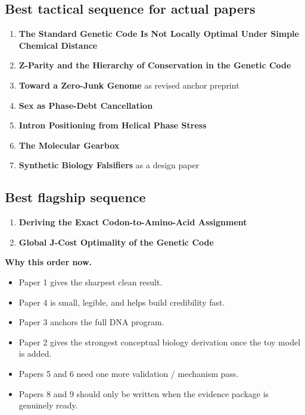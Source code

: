 \documentclass[11pt]{article}
\begin{document}
\subsection*{Best tactical sequence for actual papers}
\begin{enumerate}
\item \textbf{The Standard Genetic Code Is Not Locally Optimal Under Simple Chemical Distance}
\item \textbf{Z-Parity and the Hierarchy of Conservation in the Genetic Code}
\item \textbf{Toward a Zero-Junk Genome} as revised anchor preprint
\item \textbf{Sex as Phase-Debt Cancellation}
\item \textbf{Intron Positioning from Helical Phase Stress}
\item \textbf{The Molecular Gearbox}
\item \textbf{Synthetic Biology Falsifiers} as a design paper
\end{enumerate}

\subsection*{Best flagship sequence}
\begin{enumerate}
\item \textbf{Deriving the Exact Codon-to-Amino-Acid Assignment}
\item \textbf{Global J-Cost Optimality of the Genetic Code}
\end{enumerate}

\textbf{Why this order now.}
\begin{itemize}
\item Paper 1 gives the sharpest clean result.
\item Paper 4 is small, legible, and helps build credibility fast.
\item Paper 3 anchors the full DNA program.
\item Paper 2 gives the strongest conceptual biology derivation once the toy model is added.
\item Papers 5 and 6 need one more validation / mechanism pass.
\item Papers 8 and 9 should only be written when the evidence package is genuinely ready.
\end{itemize}
\end{document}
